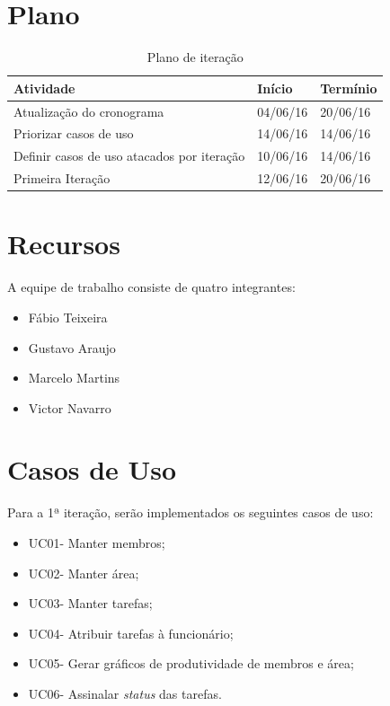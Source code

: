 \begin{apendicesenv}
\section{Plano}

\begin{table}[!h]
\centering
\caption{Plano de iteração}
\label{iteration-plan}
\begin{tabular}{|l|l|l|}
\hline
Atividade                                  & Início   & Termínio \\ \hline
Atualização do cronograma                  & 04/06/16 & 20/06/16 \\ \hline
Priorizar casos de uso                     & 14/06/16 & 14/06/16 \\ \hline
Definir casos de uso atacados por iteração & 10/06/16 & 14/06/16 \\ \hline
Primeira Iteração                          & 12/06/16 & 20/06/16 \\ \hline
\end{tabular}
\end{table}

\clearpage{}

\section{Recursos}
A equipe de trabalho consiste de quatro integrantes:
\begin{itemize}
\item Fábio Teixeira
\item Gustavo Araujo
\item Marcelo Martins
\item Victor Navarro
\end{itemize}

\section{Casos de Uso}
Para a 1ª iteração, serão implementados os seguintes casos de uso:
\begin{itemize}
\item UC01- Manter membros;
\item UC02- Manter área;
\item UC03- Manter tarefas;
\item UC04- Atribuir tarefas à funcionário;
\item UC05- Gerar gráficos de produtividade de membros e área;
\item UC06- Assinalar \textit{status} das tarefas.
\end{itemize}


\end{apendicesenv}
